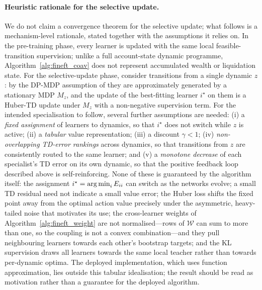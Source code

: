 \paragraph{Heuristic rationale for the selective update.} We do not claim a convergence theorem for the selective update; what follows is a mechanism-level rationale, stated together with the assumptions it relies on. In the pre-training phase, every learner is updated with the same local feasible-transition supervision; unlike a full account-state dynamic programme, Algorithm~\ref{alg:fineft_coav} does not represent accumulated wealth or liquidation state. For the selective-update phase, consider transitions from a single dynamic $z$: by the DP-MDP assumption of  they are approximately generated by a stationary MDP $M_z$, and the update of the best-fitting learner $i^\star$ on them is a Huber-TD update under $M_z$ with a non-negative supervision term. For the intended specialisation to follow, several further assumptions are needed: (i) a \emph{fixed assignment} of learners to dynamics, so that $i^\star$ does not switch while $z$ is active; (ii) a \emph{tabular} value representation; (iii) a discount $\gamma<1$; (iv) \emph{non-overlapping TD-error rankings} across dynamics, so that transitions from $z$ are consistently routed to the same learner; and (v) a \emph{monotone decrease} of each specialist's TD error on its own dynamic, so that the positive feedback loop described above is self-reinforcing. None of these is guaranteed by the algorithm itself: the assignment $i^\star=\operatorname*{arg\,min}_i E_{ii}$ can switch as the networks evolve; a small TD residual need not indicate a small value error; the Huber loss shifts the fixed point away from the optimal action value precisely under the asymmetric, heavy-tailed noise that motivates its use; the cross-learner weights of Algorithm~\ref{alg:fineft_weight} are not normalised---rows of $\mathcal{W}$ can sum to more than one, so the coupling is not a convex combination---and they pull neighbouring learners towards each other's bootstrap targets; and the KL supervision draws all learners towards the same local teacher rather than towards per-dynamic optima. The deployed implementation, which uses function approximation, lies outside this tabular idealisation; the result should be read as motivation rather than a guarantee for the deployed algorithm.


